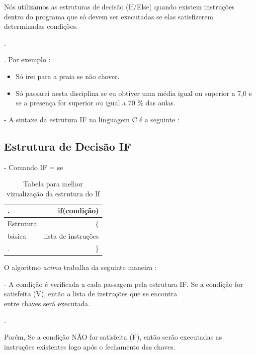 \documentclass[a4paper,10pt]{article}  %
\begin{document}
    Nós utilizamos as estruturas de decisão (If/Else) quando existem instruções
dentro do programa que só devem ser executadas se elas satisfizerem  
determinadas condições.


  .

  . Por exemplo :

\begin{itemize}
               
       \item  Só irei para a praia se não chover. 
       \item  Só passarei nesta disciplina se eu obtiver uma média igual ou superior a 7,0 e se a presença for superior ou igual a 70 \% das aulas.
             
\end{itemize}

   - A sintaxe da estrutura IF na linguagem C é a seguinte :
 
 \subsection{Estrutura de Decisão IF}   
       
  -  Comando IF = se
   
\begin{table}[H]
\begin{center}
 \caption{Tabela para melhor vizualização da estrutura do If}
\begin{tabular}{|l|r|}
  \hline \hline
  
  .          & if(condição) \\ \hline
  Estrutura  &  \{           \\ \hline
    básica   &   lista de instruções  \\ \hline
.            &  \}             \\ \hline
  
\end{tabular}
\label{tab:resultados}
\end{center}
\end{table}


  O algoritmo \textit{acima} trabalha da seguinte maneira :
 

  -  A condição é verificada a cada passagem pela estrutura IF. Se a condição for satisfeita (V), então a lista de instruções que se encontra\\ entre chaves será executada.

 .

   Porém, Se a condição NÃO for satisfeita (F), então serão executadas as instruções existentes logo após o fechamento das chaves.
 
\end{document}
